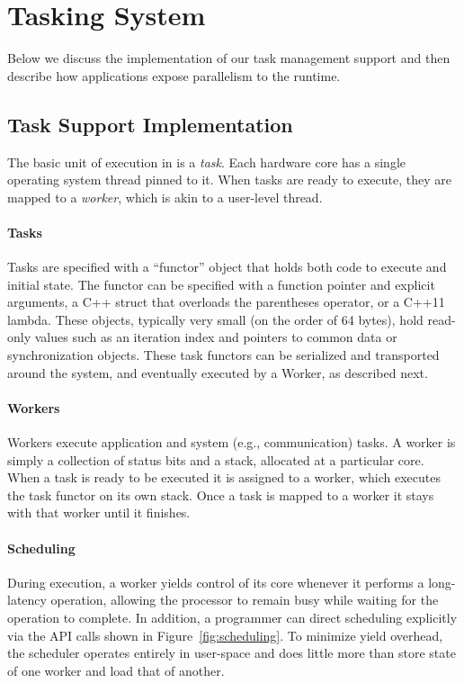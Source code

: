 \section{Tasking System}

Below we discuss the implementation of our task management support and then
describe how applications expose parallelism to the \Grappa runtime.

\subsection{Task Support Implementation}

The basic unit of execution in \Grappa is a {\em task}. Each hardware core has
a single operating system thread pinned to it. When tasks are ready to
execute, they are mapped to a {\em worker}, which is akin to a user-level
thread. %

\paragraph{Tasks} 
Tasks are specified with a ``functor'' object that holds both code to execute and initial state. The functor can be specified with a function pointer and explicit arguments, a C++ struct that overloads the parentheses operator, or a C++11 lambda. These objects, typically very small (on the order of 64 bytes), hold read-only values such as an iteration index and pointers to common data or synchronization objects. These task functors can be serialized and transported around the system, and eventually executed by a Worker, as described next.

\paragraph{Workers} Workers execute application and system (e.g.,
communication) tasks. A worker is simply a collection of status bits and a
stack, allocated at a particular core. When a task is ready to be executed it
is assigned to a worker, which executes the task functor on its own stack. 
Once a task is mapped to a worker it stays with that worker until it finishes.

\paragraph{Scheduling} During execution, a worker yields control of its core
whenever it performs a long-latency operation, allowing the processor to
remain busy while waiting for the operation to complete. In addition, a
programmer can direct scheduling explicitly via the \Grappa API calls shown in
Figure~\ref{fig:scheduling}. To minimize yield overhead, the \Grappa scheduler
operates entirely in user-space and does little more than store state of one
worker and load that of another.

